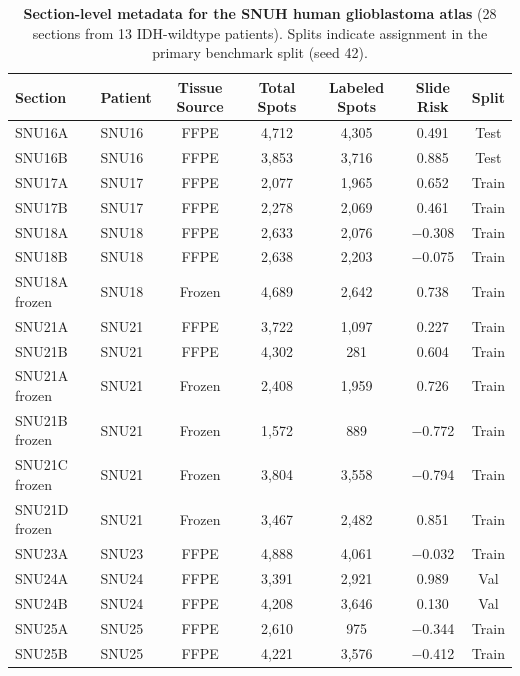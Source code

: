 \documentclass[11pt,letterpaper]{article}
\begin{document}
\clearpage

\begin{table}[H]
\centering
\caption{\textbf{Section-level metadata for the SNUH human glioblastoma atlas} (28 sections from 13 IDH-wildtype patients). Splits indicate assignment in the primary benchmark split (seed 42).}
\label{tab:s3}
\footnotesize
\setlength{\tabcolsep}{4.5pt}
\begin{tabular}{llccccc}
\toprule
\textbf{Section} & \textbf{Patient} & \textbf{Tissue Source} & \textbf{Total Spots} & \textbf{Labeled Spots} & \textbf{Slide Risk} & \textbf{Split} \\
\midrule
SNU16A         & SNU16   & FFPE   & 4{,}712 & 4{,}305 & 0.491  & Test \\
SNU16B         & SNU16   & FFPE   & 3{,}853 & 3{,}716 & 0.885  & Test \\
SNU17A         & SNU17   & FFPE   & 2{,}077 & 1{,}965 & 0.652  & Train \\
SNU17B         & SNU17   & FFPE   & 2{,}278 & 2{,}069 & 0.461  & Train \\
SNU18A         & SNU18   & FFPE   & 2{,}633 & 2{,}076 & $-$0.308 & Train \\
SNU18B         & SNU18   & FFPE   & 2{,}638 & 2{,}203 & $-$0.075 & Train \\
SNU18A frozen  & SNU18   & Frozen & 4{,}689 & 2{,}642 & 0.738  & Train \\
SNU21A         & SNU21   & FFPE   & 3{,}722 & 1{,}097 & 0.227  & Train \\
SNU21B         & SNU21   & FFPE   & 4{,}302 & 281     & 0.604  & Train \\
SNU21A frozen  & SNU21   & Frozen & 2{,}408 & 1{,}959 & 0.726  & Train \\
SNU21B frozen  & SNU21   & Frozen & 1{,}572 & 889     & $-$0.772 & Train \\
SNU21C frozen  & SNU21   & Frozen & 3{,}804 & 3{,}558 & $-$0.794 & Train \\
SNU21D frozen  & SNU21   & Frozen & 3{,}467 & 2{,}482 & 0.851  & Train \\
SNU23A         & SNU23   & FFPE   & 4{,}888 & 4{,}061 & $-$0.032 & Train \\
SNU24A         & SNU24   & FFPE   & 3{,}391 & 2{,}921 & 0.989  & Val \\
SNU24B         & SNU24   & FFPE   & 4{,}208 & 3{,}646 & 0.130  & Val \\
SNU25A         & SNU25   & FFPE   & 2{,}610 & 975     & $-$0.344 & Train \\
SNU25B         & SNU25   & FFPE   & 4{,}221 & 3{,}576 & $-$0.412 & Train \\

\end{tabular}
\end{table}
\end{document}
